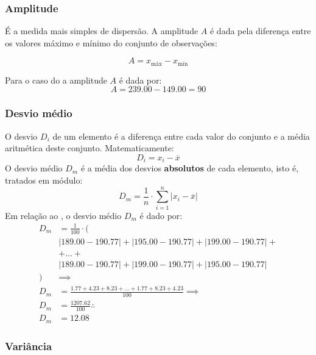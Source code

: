 \subsubsection{Amplitude}

É a medida mais simples de dispersão. A amplitude $A$ é dada pela diferença
entre os valores máximo e mínimo do conjunto de observações:

\begin{equation}
    A = x_{\textrm{máx}} - x_{\textrm{mín}}
    \label{eq:amplitude}
\end{equation}

Para o caso do  a amplitude $A$ é dada por:
\[
A=239.00-149.00=90
\]

\subsubsection{Desvio médio}

O desvio $D_i$ de um elemento é a diferença entre cada valor do conjunto e a
média aritmética deste conjunto. Matematicamente:
\[
    D_i = x_i - \overline{x}
\]
O desvio médio $D_m$ é a média dos desvios \textbf{absolutos} de cada elemento,
isto é, tratados em módulo:
\begin{equation}
    D_m = \frac{1}{n} \cdot \sum_{i=1}^{n} \lvert x_i - \overline{x} \rvert
    \label{eq:desvio-medio}
\end{equation}
Em relação ao , o desvio médio $D_m$ é dado por:
\begin{align*}
    D_m &= \frac{1}{100} \cdot \Big( \\
    &\lvert 189.00-190.77 \rvert + \lvert 195.00-190.77 \rvert + \lvert 199.00-190.77 \rvert + \\
    &+ \ldots + \\
    &\lvert 189.00-190.77 \rvert + \lvert 199.00-190.77 \rvert + \lvert 195.00-190.77 \rvert \\
    \Big) &\implies \\
    D_m &= \frac{1.77 + 4.23 + 8.23 + \ldots + 1.77 + 8.23 + 4.23}{100} \implies \\
    D_m &= \frac{1207.62}{100} \therefore \\
    D_m &= 12.08
\end{align*}

\subsubsection{Variância}

